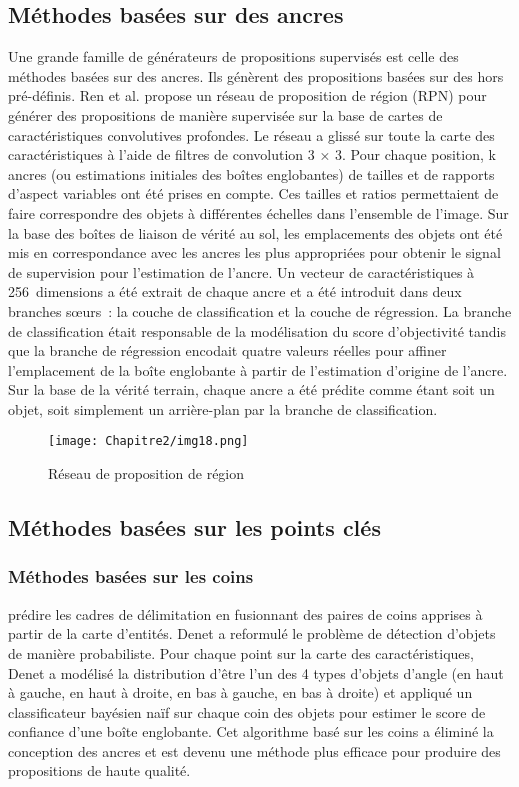      \subsection{Méthodes basées sur des ancres}
     Une grande famille de générateurs de propositions supervisés est celle des méthodes basées sur des ancres. Ils génèrent des propositions basées sur des hors pré-définis. Ren et al. propose un réseau de proposition de région (RPN) \cite{rcnn_paper} pour générer des propositions de manière supervisée sur la base de cartes de caractéristiques convolutives profondes. Le réseau a glissé sur toute la carte des caractéristiques à l'aide de filtres de convolution 3 × 3. Pour chaque position, k ancres (ou estimations initiales des boîtes englobantes) de tailles et de rapports d'aspect variables ont été prises en compte. Ces tailles et ratios permettaient de faire correspondre des objets à différentes échelles dans l'ensemble de l'image. Sur la base des boîtes de liaison de vérité au sol, les emplacements des objets ont été mis en correspondance avec les ancres les plus appropriées pour obtenir le signal de supervision pour l'estimation de l'ancre. Un vecteur de caractéristiques à 256 dimensions a été extrait de chaque ancre et a été introduit dans deux branches sœurs : la couche de classification et la couche de régression. La branche de classification était responsable de la modélisation du score d'objectivité tandis que la branche de régression encodait quatre valeurs réelles pour affiner l'emplacement de la boîte englobante à partir de l'estimation d'origine de l'ancre. Sur la base de la vérité terrain, chaque ancre a été prédite comme étant soit un objet, soit simplement un arrière-plan par la branche de classification.
     \begin{figure}[H]
          \centering
          \texttt{[image: Chapitre2/img18.png]}
          \caption{Réseau de proposition de région \cite{diagram_rpn_overflow}}
          \label{img18}
          \end{figure}

     \subsection{Méthodes basées sur les points clés}
     \subsubsection{Méthodes basées sur les coins} prédire les cadres de délimitation en fusionnant des paires de coins apprises à partir de la carte d'entités. Denet \cite{denet_paper} a reformulé le problème de détection d'objets de manière probabiliste. Pour chaque point sur la carte des caractéristiques, Denet a modélisé la distribution d'être l'un des 4 types d'objets d'angle (en haut à gauche, en haut à droite, en bas à gauche, en bas à droite) et appliqué un classificateur bayésien naïf sur chaque coin des objets pour estimer le score de confiance d'une boîte englobante. Cet algorithme basé sur les coins a éliminé la conception des ancres et est devenu une méthode plus efficace pour produire des propositions de haute qualité.
